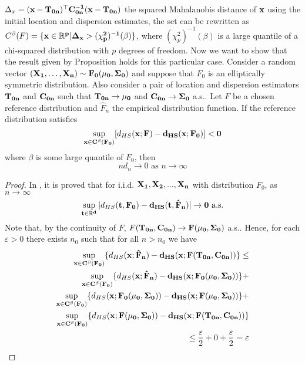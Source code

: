 \documentclass[a4paper,12pt]{article}
\begin{document}
$\Delta_x = (\bf{x} - \bf{T}_{0n})^\top \bf{C}_{0n}^{-1}(\bf{x} - \bf{T}_{0n})$ the squared Mahalanobis distance of $\bf{x}$ using the initial location and dispersion estimates, the set can be rewritten as $C^\beta(F) = \{ \bf{x} \in \mathbb{R}^p | \Delta_x > (\chi^2_p)^{-1}(\beta) \}$, where $(\chi^2_p)^{-1}(\beta)$ is a large quantile of a chi-squared distribution with $p$ degrees of freedom.  
Now we want to show that the result given by Proposition  holds for this particular case. 
Consider a random vector $(\bf{X}_1, \ldots , \bf{X}_n) \sim F_0(\bf{\mu}_0, \bf{\Sigma}_0)$ and suppose that $F_0$ is an elliptically symmetric distribution. Also consider a pair of location and dispersion estimators $\bf{T}_{0n}$ and $\bf{C}_{0n}$ such that $\bf{T}_{0n} \rightarrow \bf{\mu}_0$ and $\bf{C}_{0n} \rightarrow \bf{\Sigma}_0$ a.s.. Let $F$ be a chosen reference distribution and $\hat{F}_n$ the empirical distribution function. If the reference distribution satisfies
\begin{equation*}
\sup_{\bf{x} \in C^\beta(F_0)} [d_{HS}(\bf{x}; F) - d_{HS}(\bf{x}; F_0)] < 0 
\end{equation*}
where $\beta$ is some large quantile of $F_0$, then   
\begin{equation*}
n d_n \rightarrow 0 \mbox{ as } n \rightarrow \infty
\end{equation*}
\begin{proof}
In \citet{Donoho1992}, it is proved that for i.i.d. $\bf{X}_1, \bf{X}_2, ... , \bf{X}_n$ with distribution $F_0$, as $n \rightarrow \infty$
\begin{equation*}
\sup_{\bf{t} \in \mathbb{R}^d} |d_{HS}(\bf{t},F_0) - d_{HS}(\bf{t},\hat{F}_n)| \rightarrow 0   \mbox{   a.s.}
\end{equation*}
Note that, by the continuity of $F$, $F(\bf{T}_{0n}, \bf{C}_{0n}) \rightarrow F(\bf{\mu}_0, \bf{\Sigma}_0)$ a.s..
Hence, for each $\varepsilon > 0$ there exists $n_0$ such that for all $n > n_0$ we have
\begin{align*}
  \sup_{\bf{x} \in C^\beta(F_0)} \{ d_{HS}(\bf{x};  \hat{F}_n) - d_{HS}(\bf{x}; F(\bf{T}_{0n}, \bf{C}_{0n})) \} \le \\
   \sup_{\bf{x} \in C^\beta(F_0)} \{ d_{HS}(\bf{x}; \hat{F}_n) - d_{HS}(\bf{x}; F_0(\bf{\mu}_0, \bf{\Sigma}_0)) \} + \\
															 \sup_{\bf{x} \in C^\beta(F_0)} \{ d_{HS}(\bf{x}; F_0(\bf{\mu}_0, \bf{\Sigma}_0)) - d_{HS}(\bf{x}; F(\bf{\mu}_0, \bf{\Sigma}_0)) \} + \\
															 \sup_{\bf{x} \in C^\beta(F_0)} \{ d_{HS}(\bf{x}; F(\bf{\mu}_0, \bf{\Sigma}_0)) - d_{HS}(\bf{x}; F(\bf{T}_{0n}, \bf{C}_{0n})) \}  \\
															\le     \frac{\varepsilon}{2} + 0 + \frac{\varepsilon}{2} = \varepsilon
\end{align*}
\end{proof}
\end{document}
